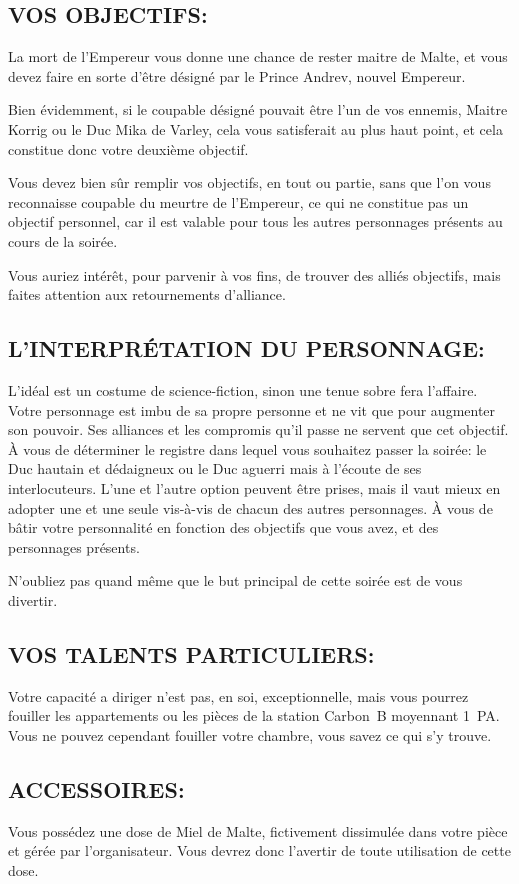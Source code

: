 \documentclass[14pt,twocolumn]{extarticle}
\begin{document}
\subsection{VOS OBJECTIFS:}

La mort de l'Empereur vous donne une chance de rester maitre de Malte, et vous
devez faire en sorte d'être désigné par le Prince Andrev, nouvel Empereur.

Bien évidemment, si le coupable désigné pouvait être l'un de vos ennemis,
Maitre Korrig ou le Duc Mika de Varley, cela vous satisferait au plus haut
point, et cela constitue donc votre deuxième objectif.

Vous devez bien sûr remplir vos objectifs, en tout ou partie, sans que l'on
vous reconnaisse coupable du meurtre de l'Empereur, ce qui ne constitue pas un
objectif personnel, car il est valable pour tous les autres personnages
présents au cours de la soirée.

Vous auriez intérêt, pour parvenir à vos fins, de trouver des alliés objectifs,
mais faites attention aux retournements d'alliance.

\subsection{L'INTERPRÉTATION DU PERSONNAGE:}

L'idéal est un costume de science-fiction, sinon une tenue sobre fera
l'affaire. Votre personnage est imbu de sa propre personne et ne vit que pour
augmenter son pouvoir. Ses alliances et les compromis qu'il passe ne servent
que cet objectif. À vous de déterminer le registre dans lequel vous souhaitez
passer la soirée: le Duc hautain et dédaigneux ou le Duc aguerri mais à
l'écoute de ses interlocuteurs. L'une et l'autre option peuvent être prises,
mais il vaut mieux en adopter une et une seule vis-à-vis de chacun des autres
personnages. À vous de bâtir votre personnalité en fonction des objectifs que
vous avez, et des personnages présents.

N'oubliez pas quand même que le but principal de cette soirée est de vous
divertir.

\subsection{VOS TALENTS PARTICULIERS:}

Votre capacité a diriger n'est pas, en soi, exceptionnelle, mais vous pourrez
fouiller les appartements ou les pièces de la station Carbon~B moyennant 1~PA.
Vous ne pouvez cependant fouiller votre chambre, vous savez ce qui s'y trouve.

\subsection{ACCESSOIRES:}

Vous possédez une dose de Miel de Malte, fictivement dissimulée dans votre
pièce et gérée par l'organisateur. Vous devrez donc l'avertir de toute
utilisation de cette dose.
\end{document}
